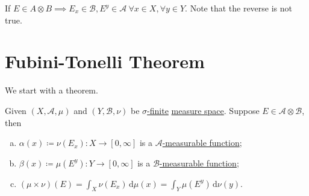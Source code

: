 \begin{prev}
	If \(E\in A\otimes B\implies E_{x} \in \mathcal{B} , E^y\in \mathcal{A}\ \forall x\in X, \forall y\in Y\). Note that the reverse is not true.
\end{prev}

\section{Fubini-Tonelli Theorem}
We start with a theorem.

\begin{theorem}\label{thm:Tonelli-for-characteristic-functions}
	Given \((X, \mathcal{A} , \mu )\) and \((Y, \mathcal{B} , \nu )\) be \hyperref[def:sigma-finite-measure]{\(\sigma\)-finite} \hyperref[def:measure-space]{measure space}. Suppose \(E\in \mathcal{A} \otimes \mathcal{B} \), then
	\begin{enumerate}[(a)]
		\item\label{thm:Tonelli-for-characteristic-functions-a} \(\alpha (x)\coloneqq \nu (E_x)\colon X\to [0, \infty ]\) is a \hyperref[def:A-measurable-function]{\(\mathcal{A}\)-measurable function};
		\item\label{thm:Tonelli-for-characteristic-functions-b} \(\beta (x)\coloneqq \mu (E^y)\colon Y\to [0, \infty ]\) is a \hyperref[def:A-measurable-function]{\(\mathcal{B}\)-measurable function};
		\item\label{thm:Tonelli-for-characteristic-functions-c} \((\mu \times \nu) (E) = \int_X \nu (E_x)\,\mathrm{d} \mu(x) = \int _Y \mu (E^y)\,\mathrm{d} \nu (y)\).
	\end{enumerate}
\end{theorem}
